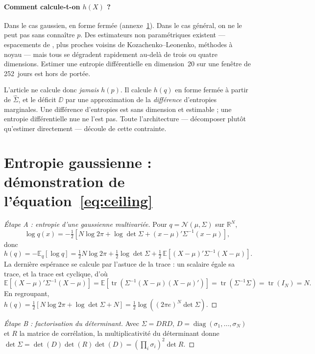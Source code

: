 \paragraph{Comment calcule-t-on $h(X)$ ?} Dans le cas gaussien, en forme fermée
(annexe~\ref{app:gauss}). Dans le cas général, on ne le peut pas sans connaître
$p$. Des estimateurs non paramétriques existent --- espacements de
\citet{vasicek1976}, plus proches voisins de Kozachenko--Leonenko, méthodes à
noyau --- mais tous se dégradent rapidement au-delà de trois ou quatre
dimensions. Estimer une entropie différentielle en dimension~20 sur une fenêtre
de 252~jours est hors de portée.

L'article ne calcule donc \emph{jamais} $h(p)$. Il calcule $h(q)$ en forme
fermée à partir de $\widehat\Sigma$, et le déficit $\DD$ par une approximation
de la \emph{différence} d'entropies marginales. Une différence d'entropies est
sans dimension et estimable ; une entropie différentielle nue ne l'est pas.
Toute l'architecture --- décomposer plutôt qu'estimer directement --- découle de
cette contrainte.

\section{Entropie gaussienne : démonstration de l'équation~\eqref{eq:ceiling}}
\label{app:gauss}

\begin{proof}[Étape A : entropie d'une gaussienne multivariée]
Pour $q=\mathcal N(\mu,\Sigma)$ sur $\mathbb{R}^N$,
\[
\log q(x) = -\tfrac12\left[N\log 2\pi + \log\det\Sigma + (x-\mu)'\Sigma^{-1}(x-\mu)\right],
\]
donc
\[
h(q) = -\mathbb{E}_q[\log q] = \tfrac12 N\log 2\pi + \tfrac12\log\det\Sigma
+ \tfrac12\,\mathbb{E}\!\left[(X-\mu)'\Sigma^{-1}(X-\mu)\right].
\]
La dernière espérance se calcule par l'astuce de la trace : un scalaire égale sa
trace, et la trace est cyclique, d'où
\[
\mathbb{E}\!\left[(X-\mu)'\Sigma^{-1}(X-\mu)\right]
= \mathbb{E}\!\left[\operatorname{tr}\!\left(\Sigma^{-1}(X-\mu)(X-\mu)'\right)\right]
= \operatorname{tr}(\Sigma^{-1}\Sigma) = \operatorname{tr}(I_N) = N .
\]
En regroupant, $h(q)=\tfrac12\left[N\log2\pi+\log\det\Sigma+N\right]
=\tfrac12\log\!\left((2\pi e)^N\det\Sigma\right)$.
\end{proof}

\begin{proof}[Étape B : factorisation du déterminant]
Avec $\Sigma=DRD$, $D=\operatorname{diag}(\sigma_1,\dots,\sigma_N)$ et $R$ la
matrice de corrélation, la multiplicativité du déterminant donne
$\det\Sigma=\det(D)\det(R)\det(D)=\left(\prod_i\sigma_i\right)^2\det R$.
\end{proof}

